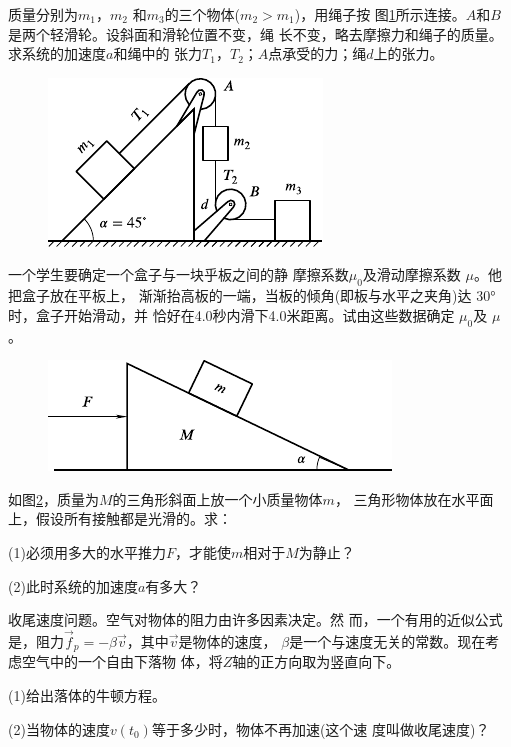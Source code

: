 \begin{exercises}
\exercise 质量分别为$ m_1 $，$ m _ { 2 } $ 和$ m_3 $的三个物体($ m _ { 2 } > m _ { 1 } $)，用绳子按
图\ref{fig:03.28}所示连接。$ A $和$ B $是两个轻滑轮。设斜面和滑轮位置不变，绳
长不变，略去摩擦力和绳子的质量。求系统的加速度$ a $和绳中的
张力$ T _ { 1 } $，$ T _ { 2 } $；$ A $点承受的力；绳$ d $上的张力。

\begin{figure}
  \centering
  \includegraphics{figure/fig03.28}
  \caption{}
  \label{fig:03.28}
\end{figure}
\exercise 一个学生要确定一个盒子与一块乎板之间的静
摩擦系数$ \mu _ 0 $及滑动摩擦系数 $\mu$。他把盒子放在平板上，
渐渐抬高板的一端，当板的倾角(即板与水平之夹角)达
\ang{30}时，盒子开始滑动，并
恰好在4.0秒内滑下4.0米距离。试由这些数据确定 $\mu_0$及 $\mu$。

\begin{figure}
  \centering
  \includegraphics{figure/fig03.29}
  \caption{}
  \label{fig:03.29}
\end{figure}
\exercise 如图\ref{fig:03.29}，质量为$ M $的三角形斜面上放一个小质量物体$ m $，
三角形物体放在水平面上，假设所有接触都是光滑的。求：

(1)必须用多大的水平推力$ F $，才能使$ m $相对于$ M $为静止？

(2)此时系统的加速度$ a $有多大？

\exercise 收尾速度问题。空气对物体的阻力由许多因素决定。然
而，一个有用的近似公式是，阻力$ \vec{f} _ { p } = - \beta \vec{v} $，其中$\vec{v}$是物体的速度，
$\beta$是一个与速度无关的常数。现在考虑空气中的一个自由下落物
体，将$ Z $轴的正方向取为竖直向下。

(1)给出落体的牛顿方程。

(2)当物体的速度$ v( t _ 0) $等于多少时，物体不再加速(这个速
度叫做收尾速度)？


\end{exercises}
